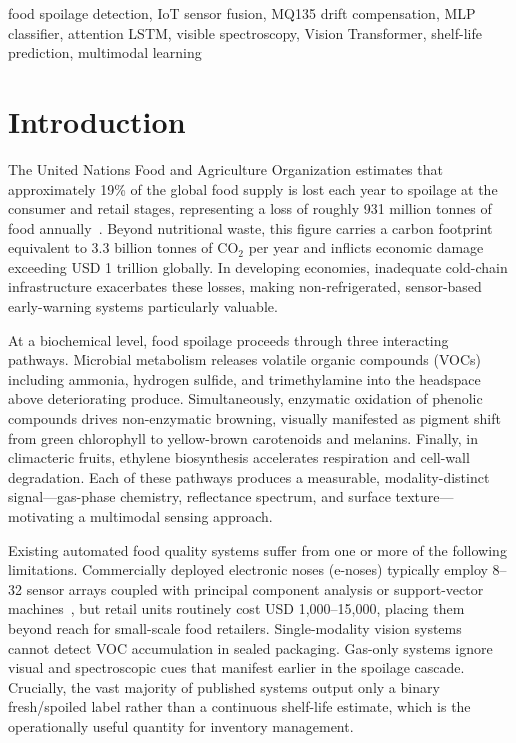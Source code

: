 \documentclass[conference]{IEEEtran}
\begin{document}
\begin{IEEEkeywords}
food spoilage detection, IoT sensor fusion, MQ135 drift compensation,
MLP classifier, attention LSTM, visible spectroscopy, Vision Transformer,
shelf-life prediction, multimodal learning
\end{IEEEkeywords}

\section{Introduction}
\label{sec:intro}

The United Nations Food and Agriculture Organization estimates that
approximately 19\% of the global food supply is lost each year to
spoilage at the consumer and retail stages, representing a loss of
roughly 931 million tonnes of food annually~\cite{DiRosa2017}.
Beyond nutritional waste, this figure carries a carbon footprint
equivalent to 3.3 billion tonnes of CO$_2$ per year and inflicts
economic damage exceeding USD 1 trillion globally. In developing
economies, inadequate cold-chain infrastructure exacerbates these
losses, making non-refrigerated, sensor-based early-warning systems
particularly valuable.

At a biochemical level, food spoilage proceeds through three
interacting pathways. Microbial metabolism releases volatile organic
compounds (VOCs) including ammonia, hydrogen sulfide, and
trimethylamine into the headspace above deteriorating produce.
Simultaneously, enzymatic oxidation of phenolic compounds drives
non-enzymatic browning, visually manifested as pigment shift from
green chlorophyll to yellow-brown carotenoids and melanins. Finally,
in climacteric fruits, ethylene biosynthesis accelerates respiration
and cell-wall degradation. Each of these pathways produces a
measurable, modality-distinct signal---gas-phase chemistry, reflectance
spectrum, and surface texture---motivating a multimodal sensing
approach.

Existing automated food quality systems suffer from one or more of the
following limitations. Commercially deployed electronic noses (e-noses)
typically employ 8--32 sensor arrays coupled with principal component
analysis or support-vector machines~\cite{Albert2012}, but retail
units routinely cost USD 1,000--15,000, placing them beyond reach for
small-scale food retailers. Single-modality vision systems~\cite{Amin2023}
cannot detect VOC accumulation in sealed packaging. Gas-only systems
ignore visual and spectroscopic cues that manifest earlier in the
spoilage cascade. Crucially, the vast majority of published systems
output only a binary fresh/spoiled label rather than a continuous
shelf-life estimate, which is the operationally useful quantity for
inventory management.
\end{document}
